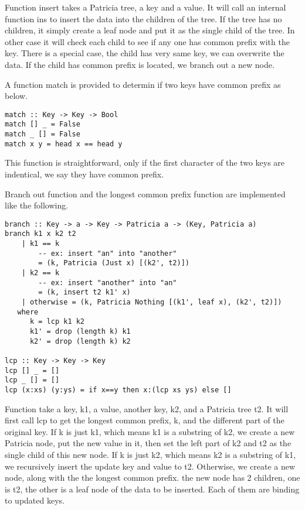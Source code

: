 \documentclass{article}
\begin{document}
Function insert takes a Patricia tree, a key and a value. It will call
an internal function ins to insert the data into the children of the tree.
If the tree has no children, it simply create a leaf node and put it
as the single child of the tree. In other case it will check each child
to see if any one has common prefix with the key. There is a special case,
the child has very same key, we can overwrite the data. If the child has common
prefix is located, we branch out a new node.

A function match is provided to determin if two keys have common prefix as 
below.

\begin{lstlisting}
match :: Key -> Key -> Bool
match [] _ = False
match _ [] = False
match x y = head x == head y
\end{lstlisting}

This function is straightforward, only if the first character of the two keys
are indentical, we say they have common prefix.

Branch out function and the longest common prefix function are implemented like
the following.

\begin{lstlisting}
branch :: Key -> a -> Key -> Patricia a -> (Key, Patricia a)
branch k1 x k2 t2 
    | k1 == k 
        -- ex: insert "an" into "another" 
        = (k, Patricia (Just x) [(k2', t2)])
    | k2 == k 
        -- ex: insert "another" into "an"
        = (k, insert t2 k1' x)
    | otherwise = (k, Patricia Nothing [(k1', leaf x), (k2', t2)]) 
   where
      k = lcp k1 k2
      k1' = drop (length k) k1
      k2' = drop (length k) k2

lcp :: Key -> Key -> Key
lcp [] _ = []
lcp _ [] = []
lcp (x:xs) (y:ys) = if x==y then x:(lcp xs ys) else []
\end{lstlisting}

Function take a key, k1, a value, another key, k2, and a Patricia tree t2. It will first
call lcp to get the longest common prefix, k, and the different part of the original key.
If k is just k1, which means k1 is a substring of k2, we create a new Patricia node, 
put the new value in it, then set the left part of k2 and t2 as the single child of this 
new node. If k is just k2, which means k2 is a substring of k1, we recursively insert
the update key and value to t2. Otherwise, we create a new node, along with the the longest
common prefix. the new node has 2 children, one is t2, the other is a leaf node of the data
to be inserted. Each of them are binding to updated keys.
\end{document}
